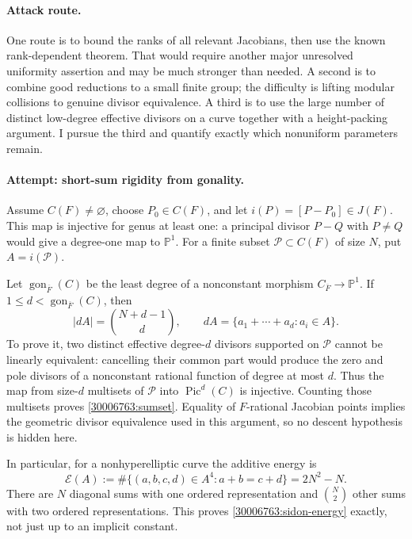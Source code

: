 \documentclass[11pt,a4paper]{article}
\newcommand{\PP}{\mathbb P}
\numberwithin{equation}{section}
\begin{document}
\paragraph{Attack route.}
One route is to bound the ranks of all relevant Jacobians, then use the
known rank-dependent theorem. That would require another major unresolved
uniformity assertion and may be much stronger than needed. A second is
to combine good reductions to a small finite group; the difficulty is
lifting modular collisions to genuine divisor equivalence. A third is
to use the large number of distinct low-degree effective divisors on a
curve together with a height-packing argument. I pursue the third and
quantify exactly which nonuniform parameters remain.

\paragraph{Attempt: short-sum rigidity from gonality.}
Assume $C(F)\ne\varnothing$, choose $P_0\in C(F)$, and let
$i(P)=[P-P_0]\in J(F)$. This map is injective for genus at least one:
a principal divisor $P-Q$ with $P\ne Q$ would give a degree-one map to
$\PP^1$. For a finite subset $\mathcal P\subset C(F)$ of size $N$, put
$A=i(\mathcal P)$.

Let $\operatorname{gon}_{\overline F}(C)$ be the least degree of a
nonconstant morphism $C_{\overline F}\to\PP^1$. If
$1\le d<\operatorname{gon}_{\overline F}(C)$, then
\begin{equation}\label{30006763:sumset}
 |dA|=\binom{N+d-1}{d},
 \qquad dA=\{a_1+\cdots+a_d:a_i\in A\}.
\end{equation}
To prove it, two distinct effective degree-$d$ divisors supported on
$\mathcal P$ cannot be linearly equivalent: cancelling their common
part would produce the zero and pole divisors of a nonconstant rational
function of degree at most $d$. Thus the map from size-$d$ multisets of
$\mathcal P$ into $\operatorname{Pic}^d(C)$ is injective. Counting those
multisets proves \eqref{30006763:sumset}. Equality of $F$-rational Jacobian
points implies the geometric divisor equivalence used in this argument,
so no descent hypothesis is hidden here.

In particular, for a nonhyperelliptic curve the additive energy is
\begin{equation}\label{30006763:sidon-energy}
 \mathcal E(A):=\#\{(a,b,c,d)\in A^4:a+b=c+d\}=2N^2-N.
\end{equation}
There are $N$ diagonal sums with one ordered representation and
$\binom N2$ other sums with two ordered representations. This proves
\eqref{30006763:sidon-energy} exactly, not just up to an implicit constant.
\end{document}
